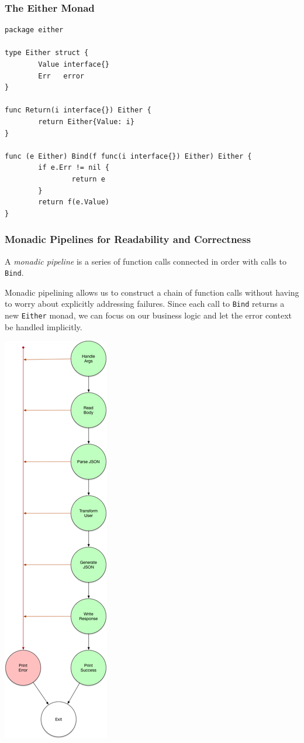 \documentclass{beamer}
\begin{document}
\begin{frame}[fragile]
  \frametitle{The Either Monad}
\begin{lstlisting}[language=Golang]
package either

type Either struct {
        Value interface{}
        Err   error
}

func Return(i interface{}) Either {
        return Either{Value: i}
}

func (e Either) Bind(f func(i interface{}) Either) Either {
        if e.Err != nil {
                return e
        }
        return f(e.Value)
}
\end{lstlisting}
\end{frame}

\begin{frame}
  \frametitle{Monadic Pipelines for Readability and Correctness}
  A \emph{monadic pipeline} is a series of function calls connected in order
  with calls to {\tt Bind}.

  \par\pause
  Monadic pipelining allows us to construct a chain of function calls
  without having to worry about explicitly addressing failures.  Since
  each call to {\tt Bind} returns a new {\tt Either} monad, we can
  focus on our business logic and let the error context be handled
  implicitly.
\end{frame}

\begin{frame}
  \begin{center}
    \includegraphics[height=.95\paperheight]{images/small/rails_graph}
  \end{center}
\end{frame}
\end{document}
